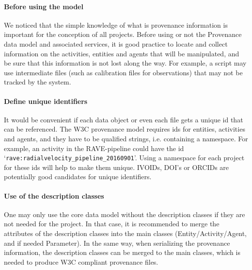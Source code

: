 \paragraph{Before using the model}
We noticed that the simple knowledge of what is provenance information is important for the conception of all projects. Before using or not the Provenance data model and associated services, it is good practice to locate and collect information on the activities, entities and agents that will be manipulated, and be sure that this information is not lost along the way. For example, a script may use intermediate files (such as calibration files for observations) that may not be tracked by the system.

\paragraph{Define unique identifiers}
It would be convenient if each data object or even each file 
gets a unique id that can be referenced. The W3C provenance model requires ids
for entities, activities and agents, and they have to be qualified strings, 
i.e. containing a namespace. For example, an activity in the RAVE-pipeline could 
have the id `\texttt{rave:radialvelocity\_pipeline\_20160901}'. 
Using a namespace for each 
project for these ids will help to make them unique. 
IVOIDs, DOI's or ORCIDs are potentially good candidates for unique identifiers.

\paragraph{Use of the description classes} 
One may only use the core data model without the description classes if they are not needed for the project. In that case, it is recommended to merge the attributes of the description classes into the main classes (Entity/Activity/Agent, and if needed Parameter). In the same way, when serializing the provenance information, the description classes can be merged to the main classes, which is needed to produce W3C compliant provenance files.

